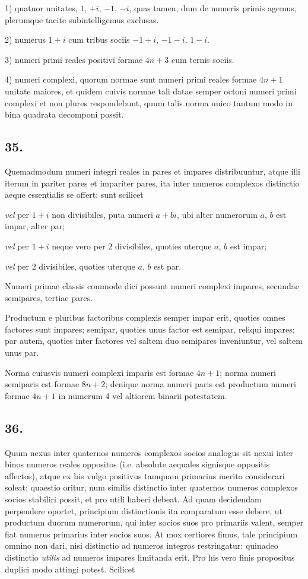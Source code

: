 \documentclass[twoside,12pt]{memoir}
\begin{document}
1) quatuor unitates, \(1\), \(+i\), \(-1\), \(-i\), quas tamen, dum de numeris primis agemus, plerumque tacite subintelligemus exclusas.
 
2) numerus \(1+i\) cum tribus sociis \(-1+i\), \(-1-i\), \(1-i\).
 
3) numeri primi reales positivi formae \(4 n+3\) cum ternis sociis.
 
4) numeri complexi, quorum normae sunt numeri primi reales formae \(4 n+1\) unitate maiores, et quidem cuivis normae tali datae semper octoni numeri primi complexi et non plures respondebunt, quum talis norma unico tantum modo in bina quadrata decomponi possit.

\subsection*{35.}
 
Quemadmodum numeri integri reales in pares et impares distribuuntur, atque illi iterum in pariter pares et impariter pares, ita inter numeros complexos distinctio aeque essentialis se offert: sunt scilicet
 
\textit{vel} per \(1+i\) non divisibiles, puta numeri \(a+b i\), ubi alter numerorum \(a\), \(b\) est impar, alter par;
 
\textit{vel} per \(1+i\) neque vero per \(2\) divisibiles, quoties uterque \(a\), \(b\) est impar;
 
\textit{vel} per \(2\) divisibiles, quoties uterque \(a\), \(b\) est par.
 
Numeri primae classis commode dici possunt numeri complexi impares, secundae semipares, tertiae pares.
 
Productum e pluribus factoribus complexis semper impar erit, quoties omnes factores sunt impares; semipar, quoties unus factor est semipar, reliqui impares; par autem, quoties inter factores vel saltem duo semipares inveniuntur, vel saltem unus par.
 
Norma cuiusvis numeri complexi imparis est formae \(4 n+1\); norma numeri semiparis est formae \(8 n+2\); denique norma numeri paris est productum numeri formae \(4 n+1\) in numerum 4 vel altiorem binarii potestatem.

\subsection*{36.}
 
Quum nexus inter quaternos numeros complexos socios analogus sit nexui inter binos numeros reales oppositos (i.e. absolute aequales signisque oppositis affectos), atque ex his vulgo positivus tamquam primarius merito considerari soleat:\pagebreak%
quaestio oritur, num similis distinctio inter quaternos numeros complexos socios stabiliri possit, et pro utili haberi debeat. Ad quam decidendam perpendere oportet, principium distinctionis ita comparatum esse debere, ut productum duorum numerorum, qui inter socios suos pro primariis valent, semper fiat numerus primarius inter socios suos. At mox certiores fimus, tale principium omnino non dari, nisi distinctio ad numeros integros restringatur: quinadeo distinctio \textit{utilis} ad numeros impares limitanda erit. Pro his vero finis propositus duplici modo attingi potest. Scilicet
 
\end{document}
